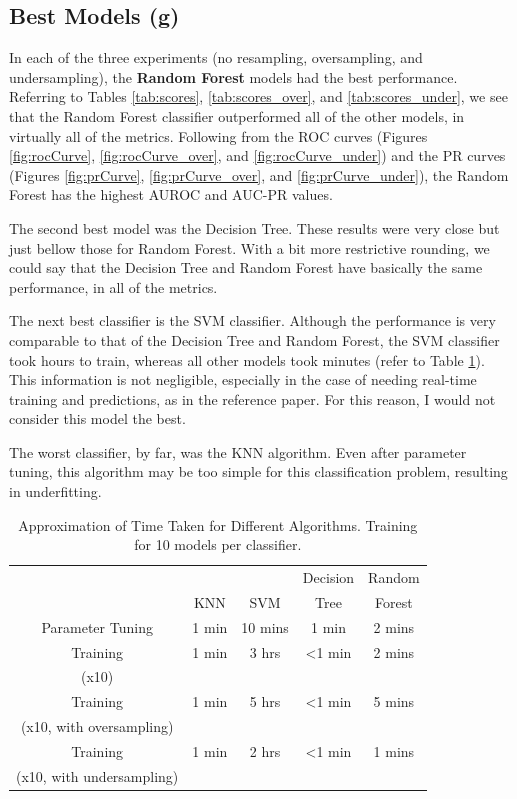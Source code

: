 \documentclass{article}
\begin{document}
\subsection{Best Models (g)}

In each of the three experiments (no resampling, oversampling, and undersampling), the \textbf{Random Forest} models had the best performance. Referring to Tables \ref{tab:scores}, \ref{tab:scores_over}, and \ref{tab:scores_under}, we see that the Random Forest classifier outperformed all of the other models, in virtually all of the metrics. Following from the ROC curves (Figures \ref{fig:rocCurve}, \ref{fig:rocCurve_over}, and \ref{fig:rocCurve_under}) and the PR curves (Figures \ref{fig:prCurve}, \ref{fig:prCurve_over}, and \ref{fig:prCurve_under}), the Random Forest has the highest AUROC and AUC-PR values.

The second best model was the Decision Tree. These results were very close but just bellow those for Random Forest. With a bit more restrictive rounding, we could say that the Decision Tree and Random Forest have basically the same performance, in all of the metrics.

The next best classifier is the SVM classifier. Although the performance is very comparable to that of the Decision Tree and Random Forest, the  SVM classifier took hours to train, whereas all other models took minutes (refer to Table \ref{tab:time}). This information is not negligible, especially in the case of needing real-time training and predictions, as in the reference paper. For this reason, I would not consider this model the best.

The worst classifier, by far, was the KNN algorithm. Even after parameter tuning, this algorithm may be too simple for this classification problem, resulting in underfitting. 

\begin{table}[H]
\centering
\begin{tabular}{| c | c | c | c | c |} 
\hline 
  &  &  & Decision  & Random  \\ 
    & KNN & SVM &  Tree &  Forest \\ \hline
\hline\hline
Parameter Tuning &  1 min & \cellcolor{red!25}10 mins & 1 min  & 2 mins  \\ \hline 
Training &  1 min & \cellcolor{red!25}3 hrs & \textless 1 min & 2 mins  \\
(x10) &  & \cellcolor{red!25} & &  \\ \hline 
Training &  1 min & \cellcolor{red!25}5 hrs & \textless 1 min  & 5 mins  \\
(x10, with oversampling) & & \cellcolor{red!25} & &  \\ \hline
Training & 1 min & \cellcolor{red!25}2 hrs & \textless 1 min  & 1 mins  \\
(x10, with undersampling) &  & \cellcolor{red!25} &  & \\ \hline
\end{tabular}
\caption{Approximation of Time Taken for Different Algorithms. Training for 10 models per classifier.}
\label{tab:time}
\end{table}
\end{document}
